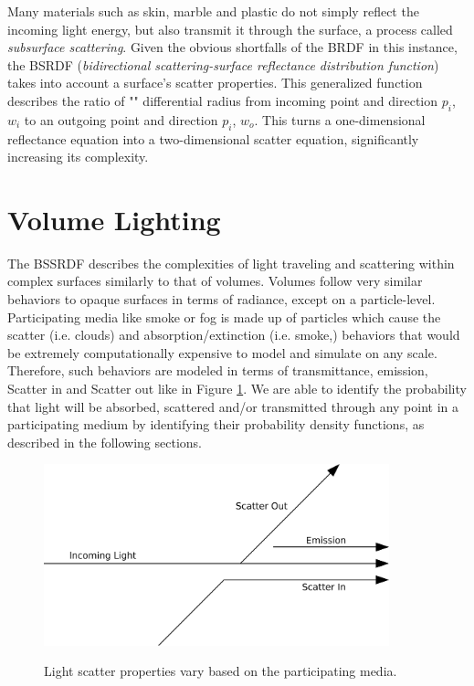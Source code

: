 \documentclass[12pt]{ucthesis}
\newcommand{\captionfonts}{\small\bf\ssp}
\begin{document}
Many materials such as skin, marble and plastic do not simply reflect the incoming light energy, but also transmit it through the surface, a process called \textit{subsurface scattering}.  Given the obvious shortfalls of the BRDF in this instance, the BSRDF (\textit{bidirectional scattering-surface reflectance distribution function}) takes into account a surface's scatter properties.  This generalized function describes the ratio of "" differential radius from incoming point and direction $\textit{p}_{i}$, $w_{i}$ to an outgoing point and direction $\textit{p}_{i}$, $w_{o}$.  This turns a one-dimensional reflectance equation into a two-dimensional scatter equation, significantly increasing its complexity.

\section{Volume Lighting}

The BSSRDF describes the complexities of light traveling and scattering within complex surfaces similarly to that of volumes.  Volumes follow very similar behaviors to opaque surfaces in terms of radiance, except on a particle-level.  Participating media like smoke or fog is made up of particles which cause the scatter (i.e. clouds) and absorption/extinction (i.e. smoke,) behaviors that would be extremely computationally expensive to model and simulate on any scale.  Therefore, such behaviors are modeled in terms of transmittance, emission, Scatter in and Scatter out like in Figure \ref{fig:vol_scat}.  We are able to identify the probability that light will be absorbed, scattered and/or transmitted through any point in a participating medium by identifying their probability density functions, as described in the following sections. 
\begin{figure}[h!]
    \centering
    \includegraphics[width=100mm]{img/diag/vol_scatter.pdf}
    \captionfonts
    \caption{Light scatter properties vary based on the participating media.}
    \label{fig:vol_scat}
\end{figure}
\end{document}

